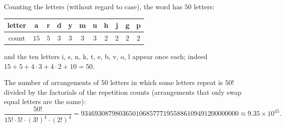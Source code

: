 Counting the letters (without regard to case), the word has $50$ letters:
\begin{center}
\begin{tabular}{c|cccccccccc}
letter & a & r & d & y & m & u & h & j & g & p\\ \hline
count & $15$ & $5$ & $3$ & $3$ & $3$ & $3$ & $2$ & $2$ & $2$ & $2$
\end{tabular}
\end{center}
and the ten letters i, s, n, k, t, e, b, v, o, l appear once each; indeed $15+5+4\cdot3+4\cdot2+10=50$.

The number of arrangements of $50$ letters in which some letters repeat is $50!$ divided by the factorials of the repetition counts (arrangements that only swap equal letters are the same):
\[\boxed{\dfrac{50!}{15!\cdot5!\cdot(3!)^4\cdot(2!)^4}}=9346930879803650106857771955886109491200000000\approx9.35\times10^{45}.\]
